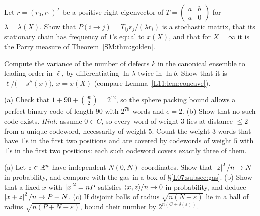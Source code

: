 \begin{exercise}\label{SM:ex:markov}
Let $r=(r_0,r_1)^T$ be a positive right eigenvector of $T=\left(\begin{smallmatrix}a&b\\a&0\end{smallmatrix}\right)$
for $\lambda=\lambda(X)$. Show that $P(i\to j)=T_{ij}r_j/(\lambda r_i)$ is a stochastic matrix, that its
stationary chain has frequency of $1$'s equal to $x(X)$, and that for $X=\infty$ it is the Parry measure
of Theorem~\ref{SM:thm:golden}.
\end{exercise}

\begin{exercise}
Compute the variance of the number of defects $k$ in the canonical ensemble to leading order in $\ell$, by
differentiating $\ln\lambda$ twice in $\ln b$. Show that it is $\ell\big/\!\big(-s''(x)\big)$, $x=x(X)$ (compare
Lemma~\ref{L11:lem:concave}).
\end{exercise}

\begin{exercise}
(a) Check that $1+90+\binom{90}2=2^{12}$, so the sphere packing bound allows a perfect binary code of
length $90$ with $2^{78}$ words and $e=2$. (b) Show that no such code exists. \emph{Hint:} assume
$0\in C$, so every word of weight $3$ lies at distance $\le2$ from a unique codeword, necessarily of
weight $5$. Count the weight-$3$ words that have $1$'s in the first two positions and are covered by
codewords of weight $5$ with $1$'s in the first two positions: each such codeword covers exactly three of them.
\end{exercise}

\begin{exercise}
(a) Let $z\in\mathbb{R}^n$ have independent $N(0,N)$ coordinates. Show that
$\left\lvert z \right\rvert^2/n\to N$ in probability, and compare with the gas in a box of
\S\ref{L07:subsec:gas}. (b) Show that a fixed $x$ with $\left\lvert x \right\rvert^2=nP$ satisfies $\langle x, z\rangle/n\to0$ in
probability, and deduce $\left\lvert x+z \right\rvert^2/n\to P+N$. (c) If disjoint balls of radius $\sqrt{n(N-\varepsilon)}$
lie in a ball of radius $\sqrt{n(P+N+\varepsilon)}$, bound their number by $2^{n(C+\delta(\varepsilon))}$.
\end{exercise}


